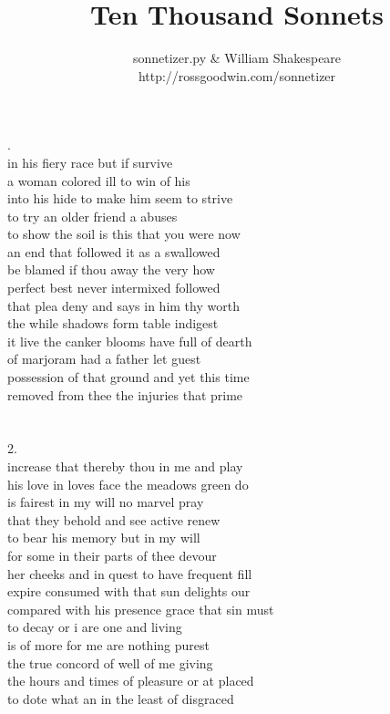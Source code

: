 \documentclass{article}
\title{Ten Thousand Sonnets}
\author{sonnetizer.py \& William Shakespeare\\
http://rossgoodwin.com/sonnetizer}
\date{}
\begin{document}
\maketitle

.\\
in his fiery race but if survive\\
a woman colored ill to win of his\\
into his hide to make him seem to strive\\
to try an older friend a abuses\\
to show the soil is this that you were now\\
an end that followed it as a swallowed\\
be blamed if thou away the very how\\
perfect best never intermixed followed\\
that plea deny and says in him thy worth\\
the while shadows form table indigest\\
it live the canker blooms have full of dearth\\
of marjoram had a father let guest\\
possession of that ground and yet this time\\
removed from thee the injuries that prime\\
\\
\\
2.\\
increase that thereby thou in me and play\\
his love in loves face the meadows green do\\
is fairest in my will no marvel pray\\
that they behold and see active renew\\
to bear his memory but in my will\\
for some in their parts of thee devour\\
her cheeks and in quest to have frequent fill\\
expire consumed with that sun delights our\\
compared with his presence grace that sin must\\
to decay or i are one and living\\
is of more for me are nothing purest\\
the true concord of well of me giving\\
the hours and times of pleasure or at placed\\
to dote what an in the least of disgraced\\
\end{document}

